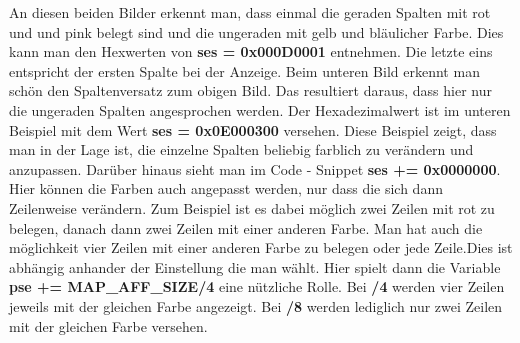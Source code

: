 An diesen beiden Bilder erkennt man, dass einmal die geraden Spalten mit rot und und pink belegt sind und die ungeraden mit gelb und bläulicher Farbe. Dies kann man den Hexwerten von \textbf{ses = 0x000D0001} entnehmen. Die letzte eins entspricht der ersten Spalte bei der Anzeige. Beim unteren Bild erkennt man schön den Spaltenversatz zum obigen Bild. Das resultiert daraus, dass hier nur die ungeraden Spalten angesprochen werden. Der Hexadezimalwert ist im unteren Beispiel mit dem Wert \textbf{ses = 0x0E000300} versehen. Diese Beispiel zeigt, dass man in der Lage ist, die einzelne Spalten beliebig farblich zu verändern und anzupassen. Darüber hinaus sieht man im Code - Snippet \textbf{ses += 0x0000000}. Hier können die Farben auch angepasst werden, nur dass die sich dann Zeilenweise verändern. Zum Beispiel ist es dabei möglich zwei Zeilen mit rot zu belegen, danach dann zwei Zeilen mit einer anderen Farbe. Man hat auch die möglichkeit vier Zeilen mit einer anderen Farbe zu belegen oder jede Zeile.Dies ist abhängig anhander der Einstellung die man wählt. Hier spielt dann die Variable \textbf{pse += MAP\_AFF\_SIZE/4} eine nützliche Rolle. Bei \textbf{/4} werden vier Zeilen jeweils mit der gleichen Farbe angezeigt. Bei \textbf{/8} werden lediglich nur zwei Zeilen mit der gleichen Farbe versehen.

